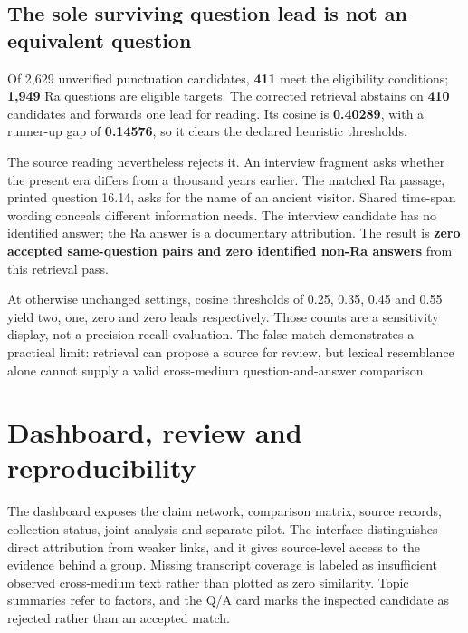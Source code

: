 \documentclass[
  11pt,
]{article}
\begin{document}
\FloatBarrier

\subsection{The sole surviving question lead is not an equivalent
question}\label{the-sole-surviving-question-lead-is-not-an-equivalent-question}

Of 2,629 unverified punctuation candidates, \textbf{411} meet the
eligibility conditions; \textbf{1,949} Ra questions are eligible
targets. The corrected retrieval abstains on \textbf{410} candidates and
forwards one lead for reading. Its cosine is \textbf{0.40289}, with a
runner-up gap of \textbf{0.14576}, so it clears the declared heuristic
thresholds.

The source reading nevertheless rejects it. An interview fragment asks
whether the present era differs from a thousand years earlier. The
matched Ra passage, printed question 16.14, asks for the name of an
ancient visitor. Shared time-span wording conceals different information
needs. The interview candidate has no identified answer; the Ra answer
is a documentary attribution. The result is \textbf{zero accepted
same-question pairs and zero identified non-Ra answers} from this
retrieval pass.

At otherwise unchanged settings, cosine thresholds of 0.25, 0.35, 0.45
and 0.55 yield two, one, zero and zero leads respectively. Those counts
are a sensitivity display, not a precision-recall evaluation. The false
match demonstrates a practical limit: retrieval can propose a source for
review, but lexical resemblance alone cannot supply a valid cross-medium
question-and-answer comparison.

\FloatBarrier

\section{Dashboard, review and
reproducibility}\label{dashboard-review-and-reproducibility}

The dashboard exposes the claim network, comparison matrix, source
records, collection status, joint analysis and separate pilot. The
interface distinguishes direct attribution from weaker links, and it
gives source-level access to the evidence behind a group. Missing
transcript coverage is labeled as insufficient observed cross-medium
text rather than plotted as zero similarity. Topic summaries refer to
factors, and the Q/A card marks the inspected candidate as rejected
rather than an accepted match.
\end{document}

